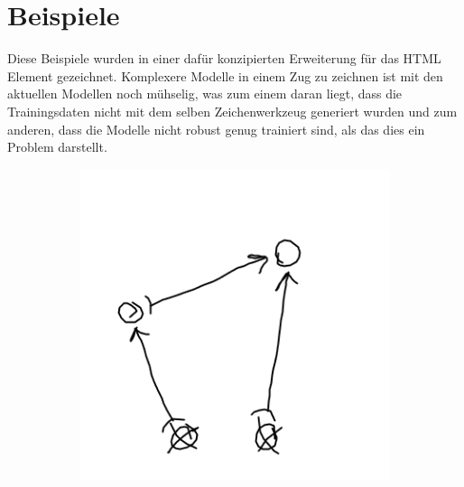 \section{Beispiele}
Diese Beispiele wurden in einer dafür konzipierten Erweiterung für das  HTML Element gezeichnet.
Komplexere Modelle in einem Zug zu zeichnen ist mit den aktuellen Modellen noch mühselig, was zum einem daran liegt, dass die Trainingsdaten nicht mit dem selben Zeichenwerkzeug generiert wurden und zum anderen, dass die Modelle nicht robust genug trainiert sind, als das dies ein Problem darstellt.

\begin{figure}[H]
    \centering
    \begin{subfigure}[b]{0.3\textwidth}
        \includegraphics[width=\textwidth]{images/4bar_sketch.png}
        \caption{}
        \label{fig:4bar_sketch}
    \end{subfigure}
    \begin{subfigure}[b]{0.3\textwidth}

\end{subfigure}
\end{figure}
